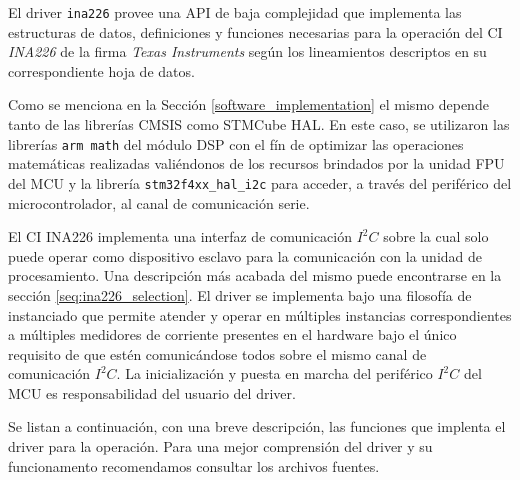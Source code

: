 \documentclass[10pt, a4paper]{article}
\newcounter{subsubsubsection}[subsubsection]
\begin{document}

El driver \texttt{ina226} provee una \acrshort{API} de baja complejidad que
implementa las estructuras de datos, definiciones y funciones necesarias para la
operación del \acrshort{CI} \emph{INA226} de la firma \emph{Texas
Instruments} según los lineamientos descriptos en su correspondiente hoja de
datos. 

Como se menciona en la Secci\'on \ref{software_implementation} el mismo
depende tanto de las librer\'ias \acrshort{CMSIS} como STMCube \acrshort{HAL}.
En este caso, se utilizaron las librer\'ias \texttt{arm math} del m\'odulo
\acrshort{DSP} con el fín de optimizar las operaciones matemáticas realizadas
valiéndonos de los recursos brindados por la unidad \acrshort{FPU} del
\acrshort{MCU} y la librería \texttt{stm32f4xx\_hal\_i2c} para acceder, a través
del periférico del microcontrolador, al canal de comunicación serie.

El \acrshort{CI} INA226 implementa una interfaz de comunicación $I^2C$ sobre la
cual solo puede operar como dispositivo esclavo para la comunicación con la
unidad de procesamiento. Una descripción más acabada del mismo puede
encontrarse en la sección \ref{seq:ina226_selection}. El driver se implementa bajo
una filosofía de instanciado que permite atender y operar en múltiples
instancias correspondientes a múltiples medidores de corriente presentes en el hardware
bajo el único requisito de que estén comunicándose todos sobre el mismo canal de
comunicación \emph{$I^2C$}. La inicialización y puesta en marcha del periférico
\emph{$I^2C$} del \acrshort{MCU} es responsabilidad del usuario del driver.

Se listan a continuación, con una breve descripción, las funciones que implenta
el driver para la operación. Para una mejor comprensión del driver y su
funcionamento recomendamos consultar los archivos fuentes.
\end{document}
